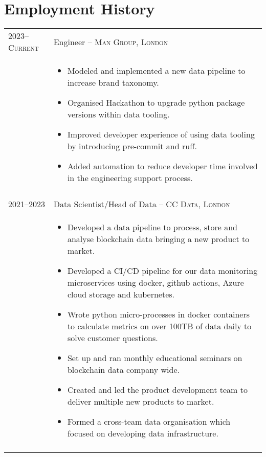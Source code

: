 \documentclass[a4paper,10pt]{article}
\begin{document}
\section{Employment History}
\begin{tabular}{p{2.25cm}|p{15cm}}
\textsc{2023--Current} & \large{Engineer -- \textsc{Man Group, London}}\\
	& \vspace{-0.07 in}\begin{itemize}
		\item Modeled and implemented a new data pipeline to increase brand taxonomy.
		\item Organised Hackathon to upgrade python package versions within data tooling.
		\item Improved developer experience of using data tooling by introducing pre-commit and ruff.
		\item Added automation to reduce developer time involved in the engineering support process.
	\end{itemize}\vspace{-0.15 in}\\
\multicolumn{2}{c}{}\\
	\textsc{2021--2023} & \large{Data Scientist/Head of Data -- \textsc{CC Data, London}}\\
	 & \vspace{-0.07 in}\begin{itemize}
	 	\item Developed a data pipeline to process, store and analyse blockchain data bringing a new product to market.
		\item Developed a CI/CD pipeline for our data monitoring microservices using docker, github actions, Azure cloud storage and kubernetes.
		\item Wrote python micro-processes in docker containers to calculate metrics on over 100TB of data daily to solve customer questions.
		\item Set up and ran monthly educational seminars on blockchain data company wide.
		\item Created and led the product development team to deliver multiple new products to market.
		\item Formed a cross-team data organisation which focused on developing data infrastructure.
	\end{itemize}\vspace{-0.15 in}\\
\multicolumn{2}{c}{}\\
%

\end{tabular}
\end{document}
